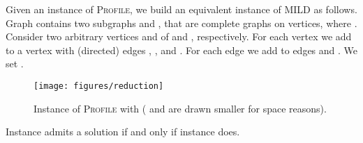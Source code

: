 \documentclass{llncs}
\begin{document}
Given an instance  of \textsc{Profile}, we build an equivalent instance  of \textsc{MILD} as follows. Graph  contains two subgraphs  and , that are complete graphs on  vertices, where . Consider two arbitrary vertices  and  of  and , respectively. For each vertex  we add to  a vertex  with (directed) edges , , and . For each edge  we add to  edges  and . We set .

\begin{figure}[htb]
\begin{center}
   \texttt{[image: figures/reduction]}
    \caption{Instance  of \textsc{Profile} with  ( and  are drawn smaller for space reasons).}\label{fi:reduction}
    \end{center}
\end{figure}

\begin{lemma}\label{le:equivalence}
Instance  admits a solution if and only if instance  does.
\end{lemma}
\end{document}
